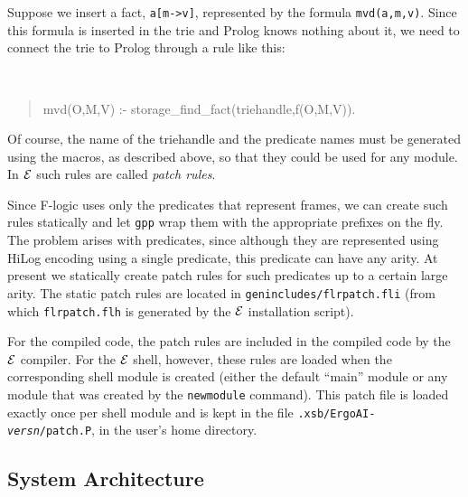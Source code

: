 \documentclass[11pt]{article}
\newcommand{\ERGO}{\mbox{\ensuremath{\cal{E}}\smaller{{\sc{RGO}}}}\xspace}
\newcommand{\FLSYSTEM}{\ERGO}
\newcommand{\fl}{\mbox{F-logic}\xspace}
\begin{document}
Suppose we insert a fact, {\tt a[m->v]}, represented by the formula
{\tt mvd(a,m,v)}. Since this formula is inserted in the trie and Prolog knows
nothing about it, we need to connect the trie to Prolog through a rule like
this:
{\tt
\begin{quote}
  mvd(O,M,V) :- storage\_find\_fact(triehandle,f(O,M,V)).
\end{quote}
}
Of course, the name of the triehandle and the predicate names must be
generated using the macros, as described above, so that they could be used
for any module. In \FLSYSTEM such rules are called \emph{patch rules}. 

Since \fl uses only the predicates that represent frames, we can
create such rules statically and let {\tt gpp} wrap them with the
appropriate prefixes on the fly.  The problem arises with predicates, since
although they are represented using HiLog encoding using a single
predicate, this predicate can have any arity.  At present we statically
create patch rules for such predicates up to a certain large arity.  The
static patch rules are located in {\tt genincludes/flrpatch.fli} (from
which {\tt flrpatch.flh} is generated by the \FLSYSTEM installation script).

For the compiled code, the patch rules are included in the compiled code
by the \FLSYSTEM compiler. For the \FLSYSTEM shell, however, these rules are
loaded when the corresponding shell module is created (either the default
``main'' module or any module that was created by the {\tt newmodule}
command). This patch file is loaded exactly once per shell module and is
kept in the file {\tt .xsb/ErgoAI-\emph{versn}/patch.P}, in the user's home directory.


\subsection{System Architecture}
\end{document}
